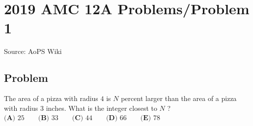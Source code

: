 \documentclass[12pt]{article}
\begin{document}
\section*{{2019 AMC 12A Problems/Problem 1}}
Source: AoPS Wiki

\subsection*{Problem}
The area of a pizza with radius $4$ is $N$ percent larger than the area of a pizza with radius $3$ inches. What is the integer closest to $N$ ? $\textbf{(A) } 25 \qquad\textbf{(B) } 33 \qquad\textbf{(C) } 44\qquad\textbf{(D) } 66 \qquad\textbf{(E) } 78$
\end{document}
